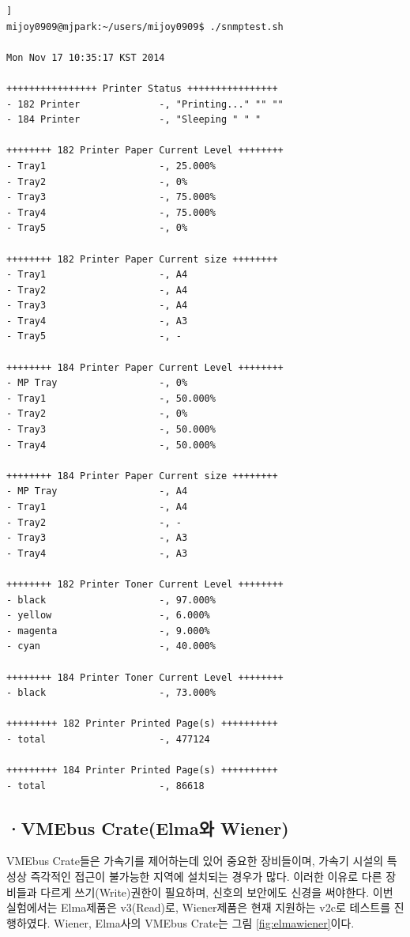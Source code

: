 \documentclass[11pt
  , a4paper
  , article
  , oneside
]{memoir}
\begin{document}
\begin{lstlisting}[style=termstyle, caption=Printer 모니터링 및 제어결과]]
mijoy0909@mjpark:~/users/mijoy0909$ ./snmptest.sh 
 
Mon Nov 17 10:35:17 KST 2014
 
++++++++++++++++ Printer Status ++++++++++++++++
- 182 Printer              -, "Printing..." "" ""
- 184 Printer              -, "Sleeping " " "
 
++++++++ 182 Printer Paper Current Level ++++++++
- Tray1                    -, 25.000%
- Tray2                    -, 0%
- Tray3                    -, 75.000%
- Tray4                    -, 75.000%
- Tray5                    -, 0%
 
++++++++ 182 Printer Paper Current size ++++++++
- Tray1                    -, A4
- Tray2                    -, A4
- Tray3                    -, A4
- Tray4                    -, A3
- Tray5                    -, -
 
++++++++ 184 Printer Paper Current Level ++++++++
- MP Tray                  -, 0%
- Tray1                    -, 50.000%
- Tray2                    -, 0%
- Tray3                    -, 50.000%
- Tray4                    -, 50.000%
 
++++++++ 184 Printer Paper Current size ++++++++
- MP Tray                  -, A4
- Tray1                    -, A4
- Tray2                    -, -
- Tray3                    -, A3
- Tray4                    -, A3
 
++++++++ 182 Printer Toner Current Level ++++++++
- black                    -, 97.000%
- yellow                   -, 6.000%
- magenta                  -, 9.000%
- cyan                     -, 40.000%
 
++++++++ 184 Printer Toner Current Level ++++++++
- black                    -, 73.000%
 
+++++++++ 182 Printer Printed Page(s) ++++++++++
- total                    -, 477124
 
+++++++++ 184 Printer Printed Page(s) ++++++++++
- total                    -, 86618
\end{lstlisting}


\subsection{·VMEbus Crate(Elma와 Wiener)}
VMEbus Crate들은 가속기를 제어하는데 있어 중요한 장비들이며, 가속기 시설의 특성상 즉각적인 접근이 불가능한 지역에 설치되는 경우가 많다. 이러한 이유로 다른 장비들과 다르게 쓰기(Write)권한이 필요하며, 신호의 보안에도 신경을 써야한다. 이번 실험에서는 Elma제품은 v3(Read)로, Wiener제품은 현재 지원하는 v2c로 테스트를 진행하였다. Wiener, Elma사의 VMEbus Crate는 그림 \ref{fig:elmawiener}이다.
\end{document}
